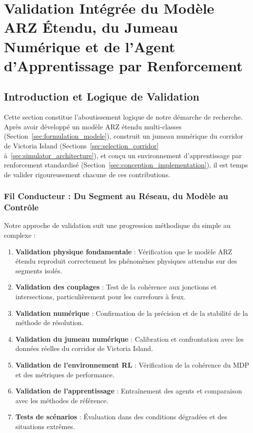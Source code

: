 \section{Validation Intégrée du Modèle ARZ Étendu, du Jumeau Numérique et de l'Agent d'Apprentissage par Renforcement}
\label{sec:validation_entrainement}

\subsection{Introduction et Logique de Validation}
\label{sec:intro_logique_validation}

Cette section constitue l'aboutissement logique de notre démarche de recherche. Après avoir développé un modèle ARZ étendu multi-classes (Section~\ref{sec:formulation_modele}), construit un jumeau numérique du corridor de Victoria Island (Sections~\ref{sec:selection_corridor} à~\ref{sec:simulator_architecture}), et conçu un environnement d'apprentissage par renforcement standardisé (Section~\ref{sec:conception_implementation}), il est temps de valider rigoureusement chacune de ces contributions.

\subsubsection{Fil Conducteur : Du Segment au Réseau, du Modèle au Contrôle}
\label{subsec:fil_conducteur}

Notre approche de validation suit une progression méthodique du simple au complexe :
\begin{enumerate}
    \item \textbf{Validation physique fondamentale} : Vérification que le modèle ARZ étendu reproduit correctement les phénomènes physiques attendus sur des segments isolés.
    \item \textbf{Validation des couplages} : Test de la cohérence aux jonctions et intersections, particulièrement pour les carrefours à feux.
    \item \textbf{Validation numérique} : Confirmation de la précision et de la stabilité de la méthode de résolution.
    \item \textbf{Validation du jumeau numérique} : Calibration et confrontation avec les données réelles du corridor de Victoria Island.
    \item \textbf{Validation de l'environnement RL} : Vérification de la cohérence du MDP et des métriques de performance.
    \item \textbf{Validation de l'apprentissage} : Entraînement des agents et comparaison avec les méthodes de référence.
    \item \textbf{Tests de scénarios} : Évaluation dans des conditions dégradées et des situations extrêmes.
\end{enumerate}

